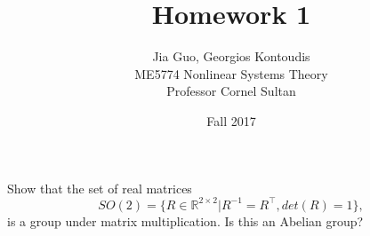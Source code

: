 \documentclass[12pt]{article}
\newenvironment{problem}[2][Problem]{\begin{trivlist}
\item[\hskip \labelsep {\bfseries #1}\hskip \labelsep {\bfseries #2.}]}{\end{trivlist}}
\begin{document}
 
 
\title{Homework 1}
\author{Jia Guo, Georgios Kontoudis\\ 
ME5774 Nonlinear Systems Theory\\
Professor Cornel Sultan} 
\date{Fall 2017}
 
\maketitle
\begin{problem}{1} %
Show that the set of real matrices
\begin{equation*}
SO(2)=\{ R\in \mathbb{R}^{2 \times 2} |R^{-1}=R^\top, det(R)=1 \},
\end{equation*}
is a group under matrix multiplication. Is this an Abelian group?
\end{problem}
\end{document}
